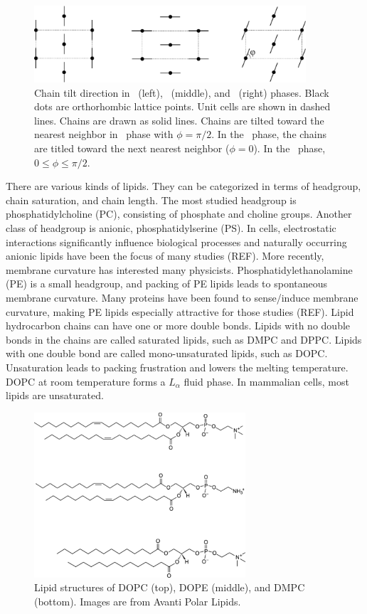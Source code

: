 \begin{figure}[htbp]
  \centering
  \includegraphics[width=0.9\textwidth]{figures/gel_phase_packing}
  \caption{Chain tilt direction in \LbetaI\ (left), \LbetaF\ (middle), and
  \LbetaL\ (right) phases. Black dots are orthorhombic lattice points.
  Unit cells are shown in dashed lines.
  Chains are drawn as solid lines. Chains are tilted toward the
  nearest neighbor in \LbetaI\ phase with $\phi=\pi/2$. 
  In the \LbetaF\ phase, the chains are titled toward the next nearest neighbor
  ($\phi=0$). In the \LbetaL\ phase, $0 \leq \phi \leq \pi/2$.}
  \label{fig:gel_phase_packing}
\end{figure}

There are various kinds of lipids. They can be 
categorized in terms of headgroup, chain saturation, and chain length.
The most studied headgroup is phosphatidylcholine (PC),
consisting of phosphate and choline groups. Another class of headgroup is
anionic, phosphatidylserine (PS). In cells, electrostatic interactions
significantly influence biological processes and naturally occurring anionic
lipids have been the focus of many studies (REF). More recently, membrane curvature
has interested many physicists. Phosphatidylethanolamine (PE) is a small 
headgroup, and packing of PE lipids leads to spontaneous membrane curvature.
Many proteins have been found to sense/induce membrane curvature, 
making PE lipids especially attractive for those studies (REF).
Lipid hydrocarbon chains can have one or more double bonds. Lipids
with no double bonds in the chains are called saturated lipids,
such as DMPC and DPPC. 
Lipids with one double bond
are called mono-unsaturated lipids, such as DOPC.
Unsaturation leads to packing frustration and lowers the melting 
temperature. DOPC at room temperature forms a $L_{\alpha}$ fluid phase.
In mammalian cells, most lipids are unsaturated.

\begin{figure}
  \centering
  \includegraphics[width=0.7\textwidth]{figures/lipid_structure}
  \caption{Lipid structures of DOPC (top), DOPE (middle),
  and DMPC (bottom). Images are from Avanti Polar Lipids.}
  \label{fig:lipid_structure}
\end{figure}

